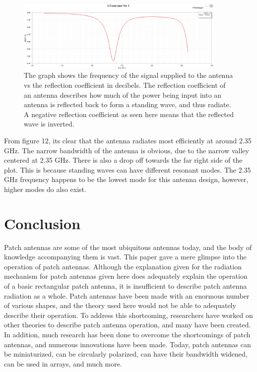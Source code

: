 \documentclass[12pt]{article}
\begin{document}
\begin{figure}[h]
    \centering
    \includegraphics[width=0.9\textwidth]{basic-patch-antenna-splot.png}
    \caption{The graph shows the frequency of the signal supplied to the antenna vs the reflection coefficient in decibels. The reflection coefficient of an antenna describes how much of the power being input into an antenna is reflected back to form a standing wave, and thus radiate. A negative reflection coefficient as seen here means that the reflected wave is inverted.}
\end{figure}

From figure 12, its clear that the antenna radiates most efficiently at around 2.35 GHz. The narrow bandwidth of the antenna is obvious, due to the narrow valley centered at 2.35 GHz. There is also a drop off towards the far right side of the plot. This is because standing waves can have different resonant modes. The 2.35 GHz frequency happens to be the lowest mode for this antenna design, however, higher modes do also exist.

\section{Conclusion}

Patch antennas are some of the most ubiquitous antennas today, and the body of knowledge accompanying them is vast. This paper gave a mere glimpse into the operation of patch antennas. Although the explanation given for the radiation mechanism for patch antennas given here does adequately explain the operation of a basic rectangular patch antenna, it is insufficient to describe patch antenna radiation as a whole\cite{balanis2016antenna}. Patch antennas have been made with an enormous number of various shapes, and the theory used here would not be able to adequately describe their operation. To address this shortcoming, researchers have worked on other theories to describe patch antenna operation, and many have been created. In addition, much research has been done to overcome the shortcomings of patch antennas, and numerous innovations have been made\cite{balanis2016antenna}. Today, patch antennas can be miniaturized, can be circularly polarized, can have their bandwidth widened, can be used in arrays, and much more. 

\newpage


\end{document}
